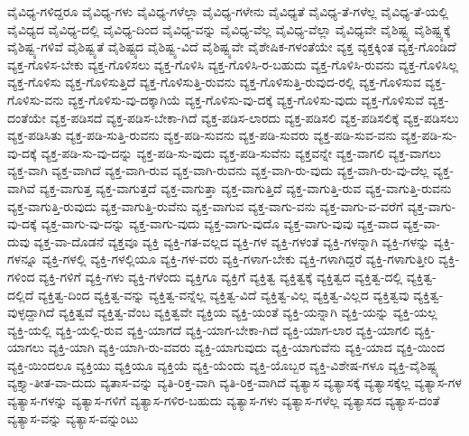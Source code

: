 {ವೈವಿಧ್ಯ-ಗಳಿದ್ದರೂ
ವೈವಿಧ್ಯ-ಗಳು
ವೈವಿಧ್ಯ-ಗಳೆಲ್ಲಾ
ವೈವಿಧ್ಯ-ಗಳೇನು
ವೈವಿಧ್ಯತೆ
ವೈವಿಧ್ಯ-ತೆ-ಗಳೆಲ್ಲ
ವೈವಿಧ್ಯ-ತೆ-ಯಲ್ಲಿ
ವೈವಿಧ್ಯದ
ವೈವಿಧ್ಯ-ದಲ್ಲಿ
ವೈವಿಧ್ಯ-ದಿಂದ
ವೈವಿಧ್ಯ-ವನ್ನು
ವೈವಿಧ್ಯ-ವೆಲ್ಲ
ವೈವಿಧ್ಯ-ವೆಲ್ಲಾ
ವೈವಿಧ್ಯವೇ
ವೈಶಿಷ್ಟ್ಯ
ವೈಶಿಷ್ಟ್ಯಕ್ಕೆ
ವೈಶಿಷ್ಟ್ಯ-ಗಳಿವೆ
ವೈಶಿಷ್ಟ್ಯತೆ
ವೈಶಿಷ್ಟ್ಯದ
ವೈಶಿಷ್ಟ್ಯ-ವಿದೆ
ವೈಶಿಷ್ಟ್ಯವೇ
ವೈಶೇಷಿಕ-ಗಳಂತೆಯೇ
ವ್ಯಕ್ತ
ವ್ಯಕ್ತಕ್ಕಿಂತ
ವ್ಯಕ್ತ-ಗೊಂಡಿದೆ
ವ್ಯಕ್ತ-ಗೊಳಿಸ-ಬೇಕು
ವ್ಯಕ್ತ-ಗೊಳಿಸಲು
ವ್ಯಕ್ತ-ಗೊಳಿಸಿ
ವ್ಯಕ್ತ-ಗೊಳಿಸಿ-ರ-ಬಹುದು
ವ್ಯಕ್ತ-ಗೊಳಿಸಿ-ರುವನು
ವ್ಯಕ್ತ-ಗೊಳಿಸಿಲ್ಲ
ವ್ಯಕ್ತ-ಗೊಳಿಸು
ವ್ಯಕ್ತ-ಗೊಳಿಸುತ್ತಿದೆ
ವ್ಯಕ್ತ-ಗೊಳಿಸುತ್ತಿ-ರುವನು
ವ್ಯಕ್ತ-ಗೊಳಿಸುತ್ತಿ-ರುವುದ-ರಲ್ಲಿ
ವ್ಯಕ್ತ-ಗೊಳಿಸುವ
ವ್ಯಕ್ತ-ಗೊಳಿಸು-ವನು
ವ್ಯಕ್ತ-ಗೊಳಿಸು-ವು-ದಕ್ಕಾಗಿಯೆ
ವ್ಯಕ್ತ-ಗೊಳಿಸು-ವು-ದಕ್ಕೆ
ವ್ಯಕ್ತ-ಗೊಳಿಸು-ವುದು
ವ್ಯಕ್ತ-ಗೊಳಿಸುವೆ
ವ್ಯಕ್ತ-ದಂತೆಯೇ
ವ್ಯಕ್ತ-ಪಡಿಸದೆ
ವ್ಯಕ್ತ-ಪಡಿಸ-ಬೇಕಾ-ಗಿದೆ
ವ್ಯಕ್ತ-ಪಡಿಸ-ಲಾರದು
ವ್ಯಕ್ತ-ಪಡಿಸಲಿ
ವ್ಯಕ್ತ-ಪಡಿಸಲಿಕ್ಕೆ
ವ್ಯಕ್ತ-ಪಡಿಸಲು
ವ್ಯಕ್ತ-ಪಡಿಸಿತು
ವ್ಯಕ್ತ-ಪಡಿ-ಸುತ್ತಿ-ರುವನು
ವ್ಯಕ್ತ-ಪಡಿ-ಸುವನು
ವ್ಯಕ್ತ-ಪಡಿ-ಸುವರು
ವ್ಯಕ್ತ-ಪಡಿ-ಸುವ-ವನು
ವ್ಯಕ್ತ-ಪಡಿ-ಸು-ವು-ದಕ್ಕೆ
ವ್ಯಕ್ತ-ಪಡಿ-ಸು-ವು-ದನ್ನು
ವ್ಯಕ್ತ-ಪಡಿ-ಸು-ವುದು
ವ್ಯಕ್ತ-ಪಡಿ-ಸುವೆನು
ವ್ಯಕ್ತವನ್ನೇ
ವ್ಯಕ್ತ-ವಾಗಲಿ
ವ್ಯಕ್ತ-ವಾಗಲು
ವ್ಯಕ್ತ-ವಾಗಿ
ವ್ಯಕ್ತ-ವಾಗಿದೆ
ವ್ಯಕ್ತ-ವಾಗಿ-ರುವ
ವ್ಯಕ್ತ-ವಾಗಿ-ರುವನು
ವ್ಯಕ್ತ-ವಾಗಿ-ರು-ವುದು
ವ್ಯಕ್ತ-ವಾಗಿ-ರು-ವು-ದೆಲ್ಲ
ವ್ಯಕ್ತ-ವಾಗಿವೆ
ವ್ಯಕ್ತ-ವಾಗುತ್ತ
ವ್ಯಕ್ತ-ವಾಗುತ್ತದೆ
ವ್ಯಕ್ತ-ವಾಗುತ್ತಾ
ವ್ಯಕ್ತ-ವಾಗುತ್ತಿದೆ
ವ್ಯಕ್ತ-ವಾಗುತ್ತಿ-ರುವ
ವ್ಯಕ್ತ-ವಾಗುತ್ತಿ-ರುವನು
ವ್ಯಕ್ತ-ವಾಗುತ್ತಿ-ರುವುದು
ವ್ಯಕ್ತ-ವಾಗುತ್ತಿ-ರುವೆನು
ವ್ಯಕ್ತ-ವಾಗುವ
ವ್ಯಕ್ತ-ವಾಗು-ವನು
ವ್ಯಕ್ತ-ವಾಗು-ವ-ವರೆಗೆ
ವ್ಯಕ್ತ-ವಾಗು-ವು-ದಕ್ಕೆ
ವ್ಯಕ್ತ-ವಾಗು-ವು-ದನ್ನು
ವ್ಯಕ್ತ-ವಾಗು-ವುದು
ವ್ಯಕ್ತ-ವಾಗು-ವುದೊ
ವ್ಯಕ್ತ-ವಾಗು-ವುವು
ವ್ಯಕ್ತ-ವಾದ
ವ್ಯಕ್ತ-ವಾ-ದುವು
ವ್ಯಕ್ತ-ವಾ-ದೊಡನೆ
ವ್ಯಕ್ತವೂ
ವ್ಯಕ್ತಿ
ವ್ಯಕ್ತಿ-ಗತ-ವಲ್ಲದ
ವ್ಯಕ್ತಿ-ಗಳ
ವ್ಯಕ್ತಿ-ಗಳಂತೆ
ವ್ಯಕ್ತಿ-ಗಳನ್ನಾಗಿ
ವ್ಯಕ್ತಿ-ಗಳನ್ನು
ವ್ಯಕ್ತಿ-ಗಳನ್ನೂ
ವ್ಯಕ್ತಿ-ಗಳಲ್ಲಿ
ವ್ಯಕ್ತಿ-ಗಳಲ್ಲಿಯೂ
ವ್ಯಕ್ತಿ-ಗಳ-ವರು
ವ್ಯಕ್ತಿ-ಗಳಾಗ-ಬೇಕು
ವ್ಯಕ್ತಿ-ಗಳಾಗಿದ್ದರೆ
ವ್ಯಕ್ತಿ-ಗಳಾಗುತ್ತೀರಿ
ವ್ಯಕ್ತಿ-ಗಳಿಂದ
ವ್ಯಕ್ತಿ-ಗಳಿಗೆ
ವ್ಯಕ್ತಿ-ಗಳು
ವ್ಯಕ್ತಿ-ಗಳೆಂದು
ವ್ಯಕ್ತಿಗೂ
ವ್ಯಕ್ತಿಗೆ
ವ್ಯಕ್ತಿತ್ವ
ವ್ಯಕ್ತಿತ್ವಕ್ಕೆ
ವ್ಯಕ್ತಿತ್ವದ
ವ್ಯಕ್ತಿತ್ವ-ದಲ್ಲಿ
ವ್ಯಕ್ತಿತ್ವ-ದಲ್ಲಿದೆ
ವ್ಯಕ್ತಿತ್ವ-ದಿಂದ
ವ್ಯಕ್ತಿತ್ವ-ವನ್ನು
ವ್ಯಕ್ತಿತ್ವ-ವನ್ನೆಲ್ಲ
ವ್ಯಕ್ತಿತ್ವ-ವಿದೆ
ವ್ಯಕ್ತಿತ್ವ-ವಿಲ್ಲ
ವ್ಯಕ್ತಿತ್ವ-ವಿಲ್ಲದ
ವ್ಯಕ್ತಿತ್ವವು
ವ್ಯಕ್ತಿತ್ವ-ವುಳ್ಳದ್ದಾಗಿದೆ
ವ್ಯಕ್ತಿತ್ವವೆ
ವ್ಯಕ್ತಿತ್ವ-ವೆಂಬ
ವ್ಯಕ್ತಿತ್ವವೇ
ವ್ಯಕ್ತಿಯ
ವ್ಯಕ್ತಿ-ಯಂತೆ
ವ್ಯಕ್ತಿ-ಯನ್ನಾಗಿ
ವ್ಯಕ್ತಿ-ಯನ್ನು
ವ್ಯಕ್ತಿ-ಯಲ್ಲ
ವ್ಯಕ್ತಿ-ಯಲ್ಲಿ
ವ್ಯಕ್ತಿ-ಯಲ್ಲಿ-ರುವ
ವ್ಯಕ್ತಿ-ಯಾಗದೆ
ವ್ಯಕ್ತಿ-ಯಾಗ-ಬೇಕಾ-ಗಿದೆ
ವ್ಯಕ್ತಿ-ಯಾಗ-ಲಾರ
ವ್ಯಕ್ತಿ-ಯಾಗಲಿ
ವ್ಯಕ್ತಿ-ಯಾಗಲು
ವ್ಯಕ್ತಿ-ಯಾಗಿ
ವ್ಯಕ್ತಿ-ಯಾಗಿ-ರು-ವವರು
ವ್ಯಕ್ತಿ-ಯಾಗುವುದು
ವ್ಯಕ್ತಿ-ಯಾಗುವೆನು
ವ್ಯಕ್ತಿ-ಯಾದ
ವ್ಯಕ್ತಿ-ಯಿಂದ
ವ್ಯಕ್ತಿ-ಯಿಂದಲೂ
ವ್ಯಕ್ತಿಯು
ವ್ಯಕ್ತಿಯೂ
ವ್ಯಕ್ತಿಯೆ
ವ್ಯಕ್ತಿ-ಯೆಂದು
ವ್ಯಕ್ತಿ-ಯೊಬ್ಬರ
ವ್ಯಕ್ತಿ-ವಿಶೇಷ-ಗಳೂ
ವ್ಯಕ್ತಿ-ವೈಶಿಷ್ಟ್ಯ
ವ್ಯಕ್ತ್ಯಾ-ತೀತ-ವಾ-ದುದು
ವ್ಯತಾಸ-ವನ್ನು
ವ್ಯತಿ-ರಿಕ್ತ-ವಾಗಿ
ವ್ಯತಿ-ರಿಕ್ತ-ವಾಗಿದೆ
ವ್ಯತ್ಯಾಸ
ವ್ಯತ್ಯಾಸಕ್ಕೆ
ವ್ಯತ್ಯಾಸಕ್ಕೆಲ್ಲ
ವ್ಯತ್ಯಾಸ-ಗಳ
ವ್ಯತ್ಯಾಸ-ಗಳನ್ನು
ವ್ಯತ್ಯಾಸ-ಗಳಿಗೆ
ವ್ಯತ್ಯಾಸ-ಗಳಿರ-ಬಹುದು
ವ್ಯತ್ಯಾಸ-ಗಳು
ವ್ಯತ್ಯಾಸ-ಗಳೆಲ್ಲ
ವ್ಯತ್ಯಾಸದ
ವ್ಯತ್ಯಾಸ-ದಂತೆ
ವ್ಯತ್ಯಾಸ-ವನ್ನು
ವ್ಯತ್ಯಾಸ-ವನ್ನುಂಟು
}
